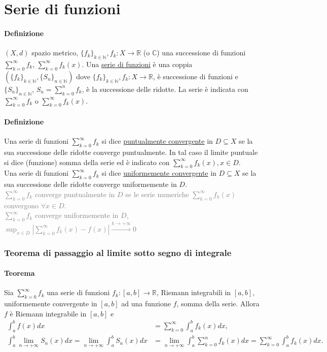 \documentclass{article}
\newcommand{\R}{\mathbb{R}}
\newcommand{\C}{\mathbb{C}}
\newcommand{\N}{\mathbb{N}}
\begin{document}
\section{\Large\textbf{Serie di funzioni}}
\paragraph{{Definizione}}
$(X,d)$ spazio metrico, $\{f_k\}_{k \in \N}, f_k : X \rightarrow \R $ (o $\C$) una successione di funzioni $\sum_{k=0}^{\infty} f_k$, $\sum_{k=0}^{\infty}f_k(x)$. Una \underline{serie di funzioni} è una coppia $(\{f_k\}_{k \in \N},\{S_n\}_{n \in \N})$ dove $\{f_k\}_{k \in \N}, f_k: X \rightarrow \R$, è successione di funzioni e $\{S_n\}_{n \in \N}$, $ S_n = \sum_{k=0}^{n}f_k$, è la successione delle ridotte. La serie è indicata con $\sum_{k=0}^{\infty}f_k$ o $\sum_{k=0}^{\infty}f_k (x)$.

\paragraph{{Definizione}}
Una serie di funzioni $\sum_{k=0}^{\infty} f_k$ si dice \underline{puntualmente convergente} in $D \subseteq X$ se la sua successione delle ridotte converge puntualmente. In tal caso il limite puntuale si dice (funzione) somma della serie ed è indicato con $\sum_{k=0}^{\infty}f_k(x), x \in D$.\\ Una serie di funzioni $\sum_{k=0}^{\infty}f_k$ si dice \underline{uniformemente convergente} in $D \subseteq X$ se la sua successione delle ridotte converge uniformemente in $D$.\\
\textcolor{grey}{$\sum_{k=0}^{\infty}f_k$ converge puntualmente in $D$ se le serie numeriche $\sum_{k=0}^{\infty}f_k(x)$ convergono $\forall x \in D$.}\\
\textcolor{grey}{$\sum_{k=0}^{\infty}f_k$ converge uniformemente in $D$, $\sup_{x \in D}|\sum_{k=0}^{\infty}f_k(x)-f(x)|\xrightarrow{k \rightarrow+\infty}0$}\\

\subsubsection{{Teorema di passaggio al limite sotto segno di integrale}}
\paragraph{{Teorema}}
Sia $\sum_{k=0}^{\infty}f_k$ una serie di funzioni $f_k: [a,b]\rightarrow \R$, Riemann integrabili in $[a,b]$, uniformemente convergente in $[a,b]$ ad una funzione $f$, somma della serie. Allora $f$ è Riemann integrabile in $[a,b]$ e 
\begin{align*}
    \int_{a}^{b}f(x)dx&=\sum_{k=0}^{\infty}\int_{a}^{b}f_k(x)dx,\\
    \int_{a}^{b}\lim_{n\rightarrow +\infty}S_n(x)dx =\lim_{n\rightarrow +\infty}\int_{a}^{b}S_n (x)dx &=
    \lim_{n\rightarrow +\infty}\int_{a}^{b}\sum_{k=0}^{n}f_k(x)dx = \sum_{k=0}^{\infty}\int_{a}^{b}f_k(x)dx.
\end{align*}
\end{document}
